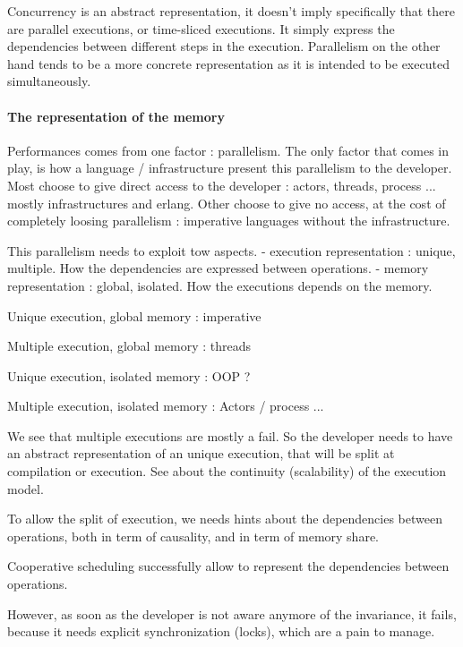 Concurrency is an abstract representation, it doesn't imply specifically that there are parallel executions, or time-sliced executions.
It simply express the dependencies between different steps in the execution.
Parallelism on the other hand tends to be a more concrete representation as it is intended to be executed simultaneously.

\paragraph{The representation of the memory}







Performances comes from one factor : parallelism.
The only factor that comes in play, is how a language / infrastructure present this parallelism to the developer.
Most choose to give direct access to the developer : actors, threads, process ... mostly infrastructures and erlang.
Other choose to give no access, at the cost of completely loosing parallelism : imperative languages without the infrastructure.

This parallelism needs to exploit tow aspects.
- execution representation : unique, multiple.
How the dependencies are expressed between operations.
- memory representation : global, isolated.
How the executions depends on the memory.

Unique execution, global memory : imperative

Multiple execution, global memory : threads

Unique execution, isolated memory : OOP ?

Multiple execution, isolated memory : Actors / process ...


We see that multiple executions are mostly a fail.
So the developer needs to have an abstract representation of an unique  execution, that will be split at compilation or execution.
See about the continuity (scalability) of the execution model.

To allow the split of execution, we needs hints about the dependencies between operations, both in term of causality, and in term of memory share.

Cooperative scheduling successfully allow to represent the dependencies between operations.

However, as soon as the developer is not aware anymore of the invariance, it fails, because it needs explicit synchronization (locks), which are a pain to manage.

